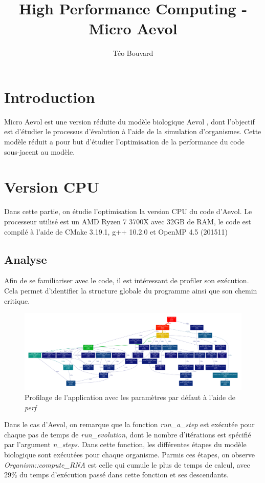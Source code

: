 \documentclass[a4paper, 10pt, twoside]{article}
\begin{document}
\title{High Performance Computing - Micro Aevol}
\author{T\'eo Bouvard}
\maketitle

\section{Introduction}

Micro Aevol est une version réduite du modèle biologique Aevol \cite{aevol}, dont l'objectif est d'étudier le processus d'évolution à l'aide de la simulation d'organismes. Cette modèle réduit a pour but d'étudier l'optimisation de la performance du code sous-jacent au modèle.

\section{Version CPU}

Dans cette partie, on étudie l'optimisation la version CPU du code d'Aevol.
Le processeur utilisé est un AMD Ryzen 7 3700X avec 32GB de RAM, le code est compilé à l'aide de CMake 3.19.1, g++ 10.2.0 et OpenMP 4.5 (201511)

\subsection{Analyse}

Afin de se familiariser avec le code, il est intéressant de profiler son exécution. Cela permet d'identifier la structure globale du programme ainsi que son chemin critique.

\begin{figure}[htpb]
	\includegraphics[width=\linewidth]{img/profile_aevol.pdf}
	\caption{Profilage de l'application avec les paramètres par défaut à l'aide de \textit{perf}}
\end{figure}

Dans le cas d'Aevol, on remarque que la fonction \textit{run\_a\_step} est exécutée pour chaque pas de temps de \textit{run\_evolution}, dont le nombre d'itérations est spécifié par l'argument \textit{n\_steps}.
Dans cette fonction, les différentes étapes du modèle biologique sont exécutées pour chaque organisme. Parmis ces étapes, on observe \textit{Organism::compute\_RNA} est celle qui cumule le plus de temps de calcul, avec 29\% du temps d'exécution passé dans cette fonction et ses descendants.
\end{document}
